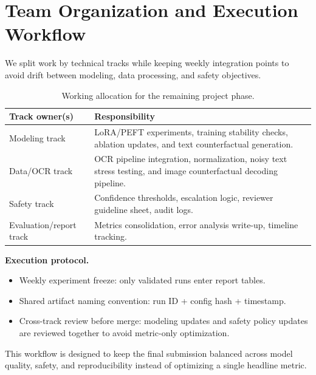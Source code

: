 \documentclass[11pt]{article}
\begin{document}
\section{Team Organization and Execution Workflow}
We split work by technical tracks while keeping weekly integration points to avoid drift between modeling, data processing, and safety objectives.

\begin{table}[h]
\centering
\small
\caption{Working allocation for the remaining project phase.}
\begin{tabularx}{\columnwidth}{lX}
\toprule
Track owner(s) & Responsibility \\
\midrule
Modeling track & LoRA/PEFT experiments, training stability checks, ablation updates, and text counterfactual generation. \\
Data/OCR track & OCR pipeline integration, normalization, noisy text stress testing, and image counterfactual decoding pipeline. \\
Safety track & Confidence thresholds, escalation logic, reviewer guideline sheet, audit logs. \\
Evaluation/report track & Metrics consolidation, error analysis write-up, timeline tracking. \\
\bottomrule
\end{tabularx}
\label{tab:roles}
\end{table}

\textbf{Execution protocol.}
\begin{itemize}[leftmargin=*]
  \item Weekly experiment freeze: only validated runs enter report tables.
  \item Shared artifact naming convention: run ID + config hash + timestamp.
  \item Cross-track review before merge: modeling updates and safety policy updates are reviewed together to avoid metric-only optimization.
\end{itemize}

This workflow is designed to keep the final submission balanced across model quality, safety, and reproducibility instead of optimizing a single headline metric.
\end{document}

